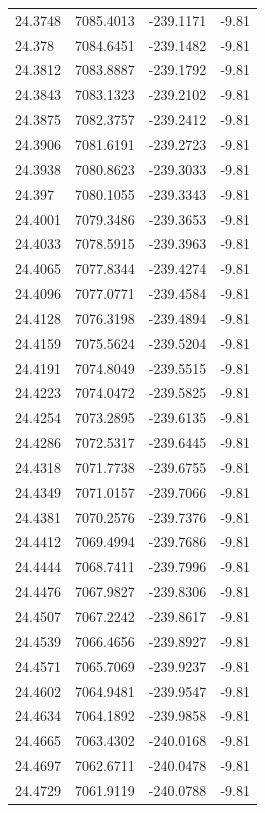 \begin{table}[H]
\begin{tabular}{llll}
24.3748 & 7085.4013 & -239.1171 & -9.81 \\
24.378 & 7084.6451 & -239.1482 & -9.81 \\
24.3812 & 7083.8887 & -239.1792 & -9.81 \\
24.3843 & 7083.1323 & -239.2102 & -9.81 \\
24.3875 & 7082.3757 & -239.2412 & -9.81 \\
24.3906 & 7081.6191 & -239.2723 & -9.81 \\
24.3938 & 7080.8623 & -239.3033 & -9.81 \\
24.397 & 7080.1055 & -239.3343 & -9.81 \\
24.4001 & 7079.3486 & -239.3653 & -9.81 \\
24.4033 & 7078.5915 & -239.3963 & -9.81 \\
24.4065 & 7077.8344 & -239.4274 & -9.81 \\
24.4096 & 7077.0771 & -239.4584 & -9.81 \\
24.4128 & 7076.3198 & -239.4894 & -9.81 \\
24.4159 & 7075.5624 & -239.5204 & -9.81 \\
24.4191 & 7074.8049 & -239.5515 & -9.81 \\
24.4223 & 7074.0472 & -239.5825 & -9.81 \\
24.4254 & 7073.2895 & -239.6135 & -9.81 \\
24.4286 & 7072.5317 & -239.6445 & -9.81 \\
24.4318 & 7071.7738 & -239.6755 & -9.81 \\
24.4349 & 7071.0157 & -239.7066 & -9.81 \\
24.4381 & 7070.2576 & -239.7376 & -9.81 \\
24.4412 & 7069.4994 & -239.7686 & -9.81 \\
24.4444 & 7068.7411 & -239.7996 & -9.81 \\
24.4476 & 7067.9827 & -239.8306 & -9.81 \\
24.4507 & 7067.2242 & -239.8617 & -9.81 \\
24.4539 & 7066.4656 & -239.8927 & -9.81 \\
24.4571 & 7065.7069 & -239.9237 & -9.81 \\
24.4602 & 7064.9481 & -239.9547 & -9.81 \\
24.4634 & 7064.1892 & -239.9858 & -9.81 \\
24.4665 & 7063.4302 & -240.0168 & -9.81 \\
24.4697 & 7062.6711 & -240.0478 & -9.81 \\
24.4729 & 7061.9119 & -240.0788 & -9.81 \\

\end{tabular}
\end{table}
